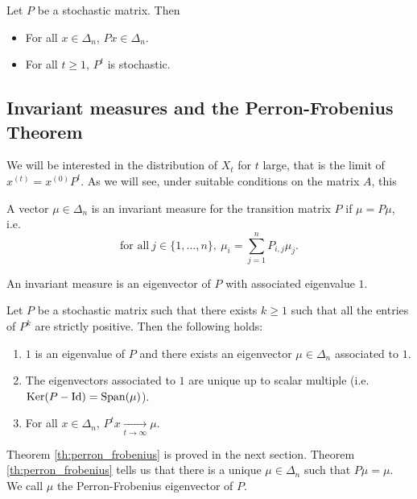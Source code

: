 \documentclass[11pt,nocut]{article}
\begin{document}
\begin{corollary}\label{cor:stab}
	Let $P$ be a stochastic matrix. Then
	\begin{itemize}
		\item For all $x \in \Delta_n$, $Px \in \Delta_n$.
		\item For all $t \geq 1$, $P^t$ is stochastic.
	\end{itemize}
\end{corollary}


\subsection{Invariant measures and the Perron-Frobenius Theorem}
We will be interested in the distribution of $X_t$ for $t$ large, that is the limit of $x^{(t)} = x^{(0)} P^t$. As we will see, under suitable conditions on the matrix $A$, this

\begin{definition}
	A vector $\mu \in \Delta_n$ is an invariant measure for the transition matrix $P$ if $\mu = P \mu$, i.e.\
	$$
	\text{for all} \ j \in \{1, \dots, n\}, \ \mu_i = \sum_{j=1}^n P_{i,j} \mu_j.
	$$
\end{definition}

\begin{remark}
	An invariant measure is an eigenvector of $P$ with associated eigenvalue $1$.
\end{remark}


\begin{theorem}\label{th:perron_frobenius}
	Let $P$ be a stochastic matrix such that there exists $k \geq 1$ such that all the entries of $P^k$ are strictly positive. Then the following holds:
	\begin{enumerate}[label=(\roman*),noitemsep]
		\item\label{item:i} $1$ is an eigenvalue of $P$ and there exists an eigenvector $\mu \in \Delta_n$ associated to $1$.
		\item\label{item:ii} The eigenvectors associated to $1$ are unique up to scalar multiple (i.e.\ ${{\rm Ker}}(P-{{\rm Id}}) = {{\rm Span}}(\mu)$).
		\item\label{item:iii} For all $x \in \Delta_n$, $P^t x \xrightarrow[t \to \infty]{} \mu$.
	\end{enumerate}
\end{theorem}

Theorem \ref{th:perron_frobenius} is proved in the next section.
Theorem \ref{th:perron_frobenius} tells us that there is a unique $\mu \in \Delta_n$ such that $P \mu = \mu$. We call $\mu$ the Perron-Frobenius eigenvector of $P$.
\end{document}
